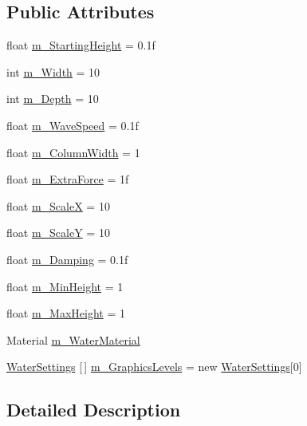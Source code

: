 \subsection*{Public Attributes}
\begin{DoxyCompactItemize}
\item 
float \mbox{\hyperlink{class_heightfield_water_af42a76461ea49b883369f0b43e72b2c1}{m\+\_\+\+Starting\+Height}} = 0.\+1f
\item 
int \mbox{\hyperlink{class_heightfield_water_a5942aae2ab0702575d735da15a9deaea}{m\+\_\+\+Width}} = 10
\item 
int \mbox{\hyperlink{class_heightfield_water_a152fe31f279786d7067a577f648e4ba0}{m\+\_\+\+Depth}} = 10
\item 
float \mbox{\hyperlink{class_heightfield_water_a99b9377dbb7aef352cf14b2f24ebf49a}{m\+\_\+\+Wave\+Speed}} = 0.\+1f
\item 
float \mbox{\hyperlink{class_heightfield_water_a7a6722aa643d9ff2c73c8a3f4bd6683e}{m\+\_\+\+Column\+Width}} = 1
\item 
float \mbox{\hyperlink{class_heightfield_water_af73d13f1e8121c6afe84cb745875b00d}{m\+\_\+\+Extra\+Force}} = 1f
\item 
float \mbox{\hyperlink{class_heightfield_water_a6eb975da78e20e8ea2ccf9e1c823a2d5}{m\+\_\+\+ScaleX}} = 10
\item 
float \mbox{\hyperlink{class_heightfield_water_a23b1cd592cc8af8517a475559023bfd3}{m\+\_\+\+ScaleY}} = 10
\item 
float \mbox{\hyperlink{class_heightfield_water_ad8074687483ebbcaa4d64ab87b10f22a}{m\+\_\+\+Damping}} = 0.\+1f
\item 
float \mbox{\hyperlink{class_heightfield_water_a72dcbfaa7af49b175c9572c7539be29f}{m\+\_\+\+Min\+Height}} = 1
\item 
float \mbox{\hyperlink{class_heightfield_water_acc97114f8276f64329c926d7ca541bc5}{m\+\_\+\+Max\+Height}} = 1
\item 
Material \mbox{\hyperlink{class_heightfield_water_ad7d054af22c270506eac14d220f850b6}{m\+\_\+\+Water\+Material}}
\item 
\mbox{\hyperlink{class_water_settings}{Water\+Settings}} \mbox{[}$\,$\mbox{]} \mbox{\hyperlink{class_heightfield_water_a7ed58ebee1bd5917266ab21cc50457dc}{m\+\_\+\+Graphics\+Levels}} = new \mbox{\hyperlink{class_water_settings}{Water\+Settings}}\mbox{[}0\mbox{]}
\end{DoxyCompactItemize}


\subsection{Detailed Description}



